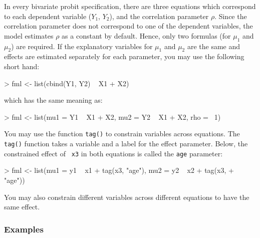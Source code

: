 In every bivariate probit specification, there are three equations
which correspond to each dependent variable ($Y_1$, $Y_2$), and the
correlation parameter $\rho$.  Since the correlation parameter does
not correspond to one of the dependent variables, the model estimates
$\rho$ as a constant by default.  Hence, only two formulas (for
$\mu_1$ and $\mu_2$) are required.  If the explanatory variables for
$\mu_1$ and $\mu_2$ are the same and effects are estimated separately
for each parameter, you may use the following short hand:  
\begin{Schunk}
\begin{Sinput}
> fml <- list(cbind(Y1, Y2) ~ X1 + X2)
\end{Sinput}
\end{Schunk}
which has the same meaning as:  
\begin{Schunk}
\begin{Sinput}
> fml <- list(mu1 = Y1 ~ X1 + X2, mu2 = Y2 ~ X1 + X2, rho = ~1)
\end{Sinput}
\end{Schunk}
You may use the function {\tt tag()} to constrain variables across
equations.  The {\tt tag()} function takes a variable and a label for
the effect parameter.  Below, the constrained effect of {\tt
x3} in both equations is called the {\tt age} parameter:  
\begin{Schunk}
\begin{Sinput}
> fml <- list(mu1 = y1 ~ x1 + tag(x3, "age"), mu2 = y2 ~ x2 + tag(x3, 
+     "age"))
\end{Sinput}
\end{Schunk}
You may also constrain different variables across different equations
to have the same effect.  

\subsubsection{Examples}

